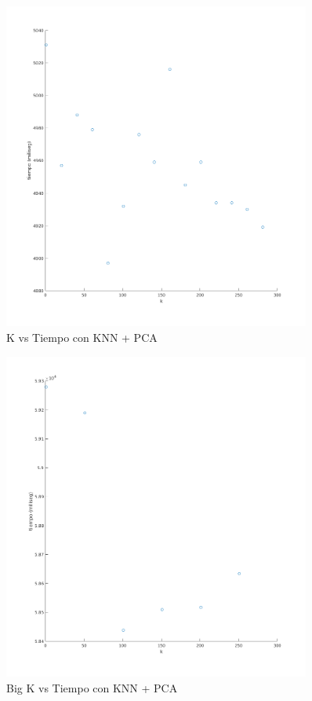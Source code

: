 \begin{figure}[H]
	\centering	\includegraphics[width=0.9\textwidth]{img/k_pca_tiempo.png}
	\caption{K vs Tiempo con KNN + PCA}
	\label{fig:K vs Tiempo con KNN + PCA}
\end{figure}
\begin{figure}[H]
	\centering	\includegraphics[width=0.9\textwidth]{img/big_k_pca_tiempo.png}
	\caption{Big K vs Tiempo con KNN + PCA}
	\label{fig:Big K vs Tiempo con KNN + PCA}
\end{figure}



